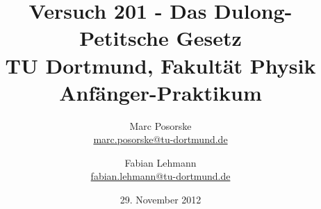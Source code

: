 ﻿%


\renewcommand*\rmdefault{iwona}\normalfont\upshape


\title{Versuch 201 - Das Dulong-Petitsche Gesetz\\				%
\large TU Dortmund, Fakultät Physik\\ 
\normalsize Anfänger-Praktikum}

\author{Marc Posorske\\			%
{\small \href{marc.posorske@tu-dortmund.de}{marc.posorske@tu-dortmund.de}}	%
\and						%
Fabian Lehmann\\					%
{\small \href{fabian.lehmann@tu-dortmund.de}{fabian.lehmann@tu-dortmund.de}}		%
}
\date{29. November 2012}				%





\maketitle					%
\thispagestyle{empty} 				%



\tableofcontents


\newpage					%



